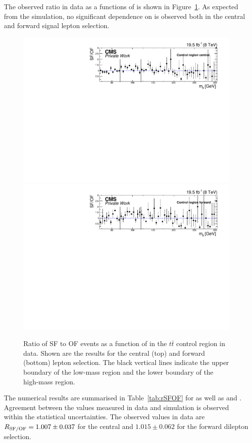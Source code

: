 The observed ratio in data as a functions of \mll is shown in Figure~\ref{fig:controlRatio}. As expected from the simulation, no significant dependence on \mll is observed both in the central and forward signal lepton selection.
\begin{figure}
\begin{center}
\includegraphics[scale=0.5]{plots/BG/control/rSFOF_ControlCentral_Full2012_Mll_None.pdf}\\
\includegraphics[scale=0.5]{plots/BG/control/rSFOF_ControlForward_Full2012_Mll_None.pdf}
\caption{Ratio of SF to OF events as a function of \mll in the $t\bar{t}$ control region in data. Shown are the results for the central (top) and forward (bottom) lepton selection. The black vertical lines indicate the upper boundary of the low-mass region and the lower boundary of the high-mass region.}
\label{fig:controlRatio}
\end{center}
\end{figure}
The numerical results are summarised in Table~\ref{tab:rSFOF} for \Rsfof as well as \Reeof and \Rmmof. Agreement between the values measured in data and simulation is observed within the statistical uncertainties. The observed values in data are $R_{\text{SF/OF}} = 1.007\pm0.037$ for the central and $1.015\pm0.062$ for the forward dilepton selection. 

